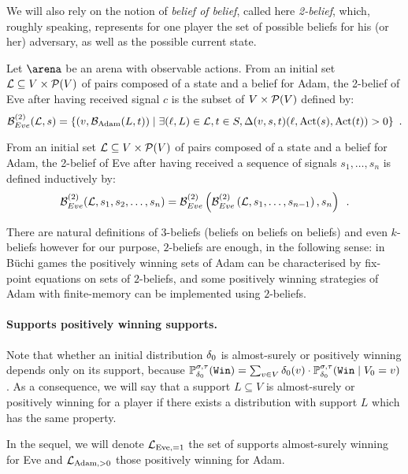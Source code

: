 We will also rely on the notion of \emph{belief of belief}, called
here \emph{2-belief}, which, roughly speaking, represents for one
player the set of possible beliefs for his (or her) adversary,
as well as the possible current state.
\begin{definition}[2-Belief]
{Let $\ar$ be an arena with observable actions.}
  From an initial set ${\mathcal{L}} \subseteq V
  \times \mathcal{P}(V)$ of pairs composed of a state and a belief
  for Adam, the 2-belief of Eve after having received signal $c$ is the subset of 
$V
  \times \mathcal{P}(V)$ defined by:
\[
  \mathcal{B}^{(2)}_{Eve}({\mathcal{L}},s) = \{ (v,\mathcal{B}_{\text{Adam}}(L,t)) \mid
\exists  (\ell,L) \in {\mathcal{L}},  t\in S,
  \Delta(v,s,t)(\ell,\text{Act}(s),\text{Act}(t))
  >0\} \enspace.
  \]

From an initial set ${\mathcal{L}} \subseteq V
\times \mathcal{P}(V)$ of pairs composed of a state and a belief
for Adam, the 2-belief of Eve after having  received a sequence of
signals $s_1,\ldots,s_n$ is defined inductively by:
\[
\mathcal{B}^{(2)}_{Eve}({\mathcal{L}},s_1,s_2,\ldots,s_n) =
\mathcal{B}^{(2)}_{Eve}\left(\mathcal{B}^{(2)}_{Eve}\left({\mathcal{L}},s_1,\ldots,s_{n-1}\right),s_n\right)\enspace.
\]
\end{definition}

There are natural definitions of $3$-beliefs (beliefs on beliefs on beliefs)
and even $k$-beliefs however for our purpose, $2$-beliefs are enough,
in the following sense:
in B{\"u}chi games the positively winning sets of Adam
can be characterised by fix-point equations on sets of $2$-beliefs,
and some positively winning strategies of Adam with finite-memory
can be implemented using $2$-beliefs.


\paragraph{Supports positively winning supports.}

Note that whether an initial distribution $\delta_0$ is almost-surely or
positively winning depends only on its support, because
$\mathbb{P}^{\sigma,\tau}_{\delta_0}({\tt Win})
=\sum_{v\in V}\delta_0(v)\cdot\mathbb{P}^{\sigma,\tau}_{\delta_0}({\tt Win} \mid V_0= v)$.
As a consequence, we will say that a support
$L\subseteq V$ is almost-surely or positively winning for a
player if there exists a distribution with support $L$ which has the
same property.

In the sequel, we will denote $\mathcal{L}_{\text{Eve},=1}$ the set of supports almost-surely winning for Eve
and  $\mathcal{L}_{\text{Adam},>0}$ those positively winning for Adam.

